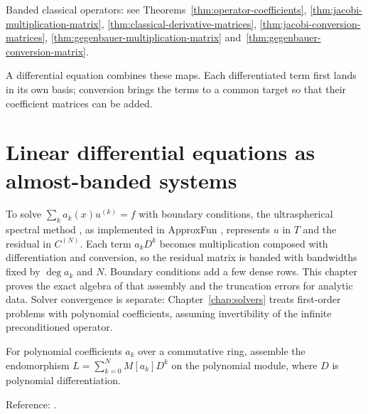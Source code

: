 Banded classical operators: see Theorems~\ref{thm:operator-coefficients}, \ref{thm:jacobi-multiplication-matrix}, \ref{thm:classical-derivative-matrices}, \ref{thm:jacobi-conversion-matrices}, \ref{thm:gegenbauer-multiplication-matrix} and~\ref{thm:gegenbauer-conversion-matrix}.


A differential equation combines these maps. Each differentiated term first
lands in its own basis; conversion brings the terms to a common target so
that their coefficient matrices can be added.

\chapter{Linear differential equations as almost-banded systems}\label{chap:odes}

To solve $\sum_k a_k(x)u^{(k)}=f$ with boundary conditions, the ultraspherical spectral
method \cite{olver-townsend}, as implemented in ApproxFun \cite{approxfun-jl}, represents
$u$ in $T$ and the residual in $C^{(N)}$. Each term $a_kD^k$ becomes
multiplication composed with differentiation and conversion, so the residual
matrix is banded with bandwidths fixed by $\deg a_k$ and $N$. Boundary
conditions add a few dense rows. This chapter proves the exact algebra of that
assembly and the truncation errors for analytic data. Solver convergence is
separate: Chapter~\ref{chap:solvers} treats first-order problems with polynomial
coefficients, assuming invertibility of the infinite preconditioned operator.

\begin{definition}
\label{def:polynomial-differential-operator}
\leanok
For polynomial coefficients $a_k$ over a commutative ring, assemble the
endomorphism $L=\sum_{k=0}^N M[a_k]D^k$ on the polynomial module, where $D$ is
polynomial differentiation.

Reference: \cite[Section 3]{olver-townsend}.
\end{definition}

